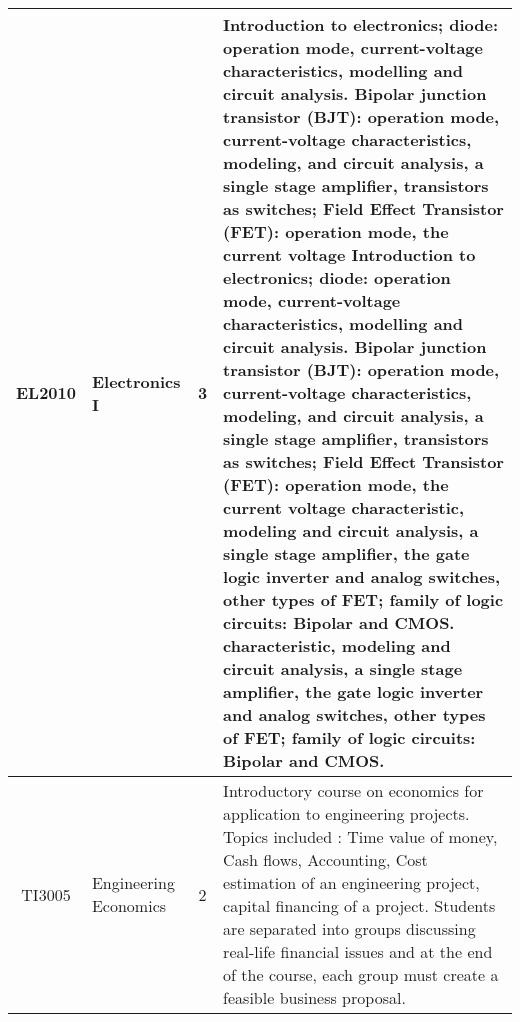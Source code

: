 \documentclass{article}
\begin{document}
\begin{center}
\begin{tabular}{ | c | B{5.4cm} | c | p{6.8cm} |}
           EL2010 & Electronics I & 3 & Introduction to electronics; diode: operation mode, current-voltage characteristics, modelling and circuit analysis. Bipolar junction transistor (BJT): operation mode, current-voltage characteristics, modeling, and circuit analysis, a single stage amplifier, transistors as switches; Field Effect Transistor (FET): operation mode, the current voltage Introduction to electronics; diode: operation mode, current-voltage characteristics, modelling and circuit analysis. Bipolar junction transistor (BJT): operation mode, current-voltage characteristics, modeling, and circuit analysis, a single stage amplifier, transistors as switches; Field Effect Transistor (FET): operation mode, the current voltage characteristic, modeling and circuit analysis, a single stage amplifier, the gate logic inverter and analog switches, other types of FET; family of logic circuits: Bipolar and CMOS. characteristic, modeling and circuit analysis, a single stage amplifier, the gate logic inverter and analog switches, other types of FET; family of logic circuits: Bipolar and CMOS. \\ \hline                                   
       
           TI3005 & Engineering Economics & 2 & Introductory course on economics for application to engineering projects. Topics included : Time value of money, Cash flows, Accounting, Cost estimation of an engineering project, capital financing of a project. Students are separated into groups discussing real-life financial issues and at the end of the course, each group must create a feasible business proposal.  \\ \hline                                                      
                               
        \end{tabular}
    \end{center}   
    
    \newpage
    
\end{document}

